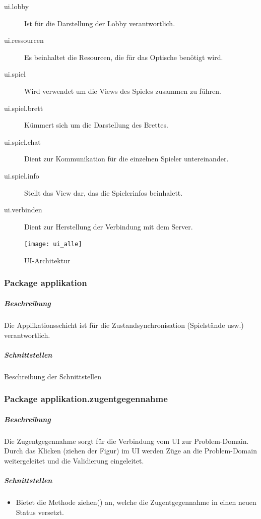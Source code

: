 \documentclass[12pt,halfparskip]{scrartcl}
\begin{document}
\begin{description}
	\item[ui.lobby] Ist für die Darstellung der Lobby verantwortlich.
	\item[ui.ressourcen] Es beinhaltet die Resourcen, die für das Optische benötigt wird.
	\item[ui.spiel] Wird verwendet um die Views des Spieles zusammen zu führen.
	\item[ui.spiel.brett] Kümmert sich um die Darstellung des Brettes.
	\item[ui.spiel.chat] Dient zur Kommunikation für die einzelnen Spieler untereinander.
	\item[ui.spiel.info] Stellt das View dar, das die Spielerinfos beinhalett.
	\item[ui.verbinden] Dient zur Herstellung der Verbindung mit dem Server.
\end{description}

\begin{figure}[h]
	\centering
	\texttt{[image: ui\_alle]}
	\caption{UI-Architektur}
	\label{fig:ui_alle}
\end{figure}

\clearpage
\subsubsection{Package applikation} %
\label{ssub:package_applikation}
\subparagraph{Beschreibung}
Die Applikationsschicht ist für die Zustandsynchronisation (Spielstände usw.) verantwortlich. 

\subparagraph{Schnittstellen} %
\label{ssub:schnittstellen}
Beschreibung der Schnittstellen

\clearpage
\subsubsection{Package applikation.zugentgegennahme} %
\label{ssub:package_applikation_zugentgegennahme}
\subparagraph{Beschreibung}
Die Zugentgegennahme sorgt für die Verbindung vom UI zur Problem-Domain. Durch das Klicken (ziehen der Figur) im UI werden Züge an die Problem-Domain weitergeleitet und die Validierung eingeleitet.

\subparagraph{Schnittstellen} %
\label{ssub:schnittstellen}
\begin{itemize}
	\item Bietet die Methode ziehen() an, welche die Zugentgegennahme in einen neuen Status versetzt.
\end{itemize}
\end{document}
